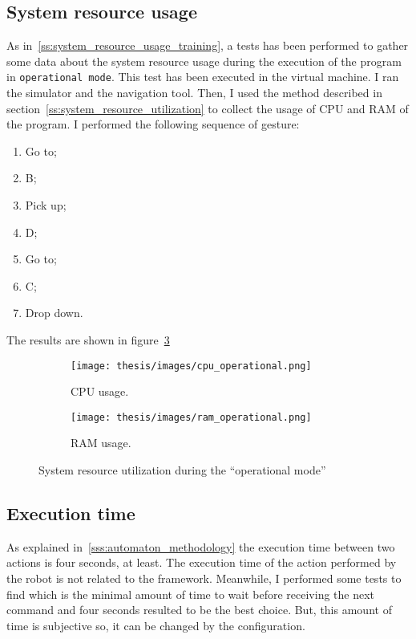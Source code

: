 \documentclass[../thesis.tex]{subfiles}
\begin{document}
\subsection{System resource usage}
As in~\ref{ss:system_resource_usage_training}, a tests has been performed to gather some data about the system resource usage during the execution of the program in \texttt{operational mode}. This test has been executed in the virtual machine. I ran the simulator and the navigation tool. Then, I used the method described in section~\ref{ss:system_resource_utilization} to collect the usage of CPU and RAM of the program. I performed the following sequence of gesture:
\begin{enumerate}
    \item Go to;
    \item B;
    \item Pick up;
    \item D;
    \item Go to;
    \item C;
    \item Drop down.
\end{enumerate}
The results are shown in figure~\ref{fig:system_resource_graphs}

\begin{figure}[H]
    \centering
    \begin{subfigure}[b]{0.45\textwidth}
        \centering
        \texttt{[image: thesis/images/cpu\_operational.png]}
        \caption{CPU usage.}
        \label{fig:cpu_usage}
    \end{subfigure}
    \hfill
    \begin{subfigure}[b]{0.45\textwidth}
        \centering
        \texttt{[image: thesis/images/ram\_operational.png]}
        \caption{RAM usage.}
        \label{fig:ram_usage}
    \end{subfigure}
    \caption{System resource utilization during the ``operational mode''}
    \label{fig:system_resource_graphs}
\end{figure}

\subsection{Execution time}
As explained in~\ref{sss:automaton_methodology} the execution time between two actions is four seconds, at least. The execution time of the action performed by the robot is not related to the framework. Meanwhile, I performed some tests to find which is the minimal amount of time to wait before receiving the next command and four seconds resulted to be the best choice. But, this amount of time is subjective so, it can be changed by the configuration.
\end{document}
